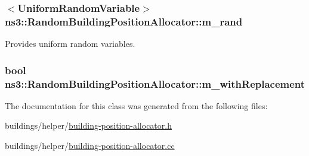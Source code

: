 \subsubsection[{\texorpdfstring{m\+\_\+rand}{m_rand}}]{$<${\bf Uniform\+Random\+Variable}$>$ ns3\+::\+Random\+Building\+Position\+Allocator\+::m\+\_\+rand\hspace{0.3cm}{\ttfamily [private]}}\hypertarget{classns3_1_1RandomBuildingPositionAllocator_aa11ea744fa9e45ba2c9a8f6d82c1934b}{}\label{classns3_1_1RandomBuildingPositionAllocator_aa11ea744fa9e45ba2c9a8f6d82c1934b}


Provides uniform random variables. 

\subsubsection[{\texorpdfstring{m\+\_\+with\+Replacement}{m_withReplacement}}]{\setlength{\rightskip}{0pt plus 5cm}bool ns3\+::\+Random\+Building\+Position\+Allocator\+::m\+\_\+with\+Replacement\hspace{0.3cm}{\ttfamily [private]}}\hypertarget{classns3_1_1RandomBuildingPositionAllocator_a3bfc96cc1609a7cbaa2a1b4de3050dc2}{}\label{classns3_1_1RandomBuildingPositionAllocator_a3bfc96cc1609a7cbaa2a1b4de3050dc2}


The documentation for this class was generated from the following files\+:\begin{DoxyCompactItemize}
\item 
buildings/helper/\hyperlink{building-position-allocator_8h}{building-\/position-\/allocator.\+h}\item 
buildings/helper/\hyperlink{building-position-allocator_8cc}{building-\/position-\/allocator.\+cc}\end{DoxyCompactItemize}
